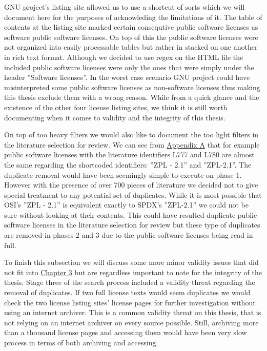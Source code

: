 GNU project's listing site allowed us to use a shortcut of sorts which we will document here for the purposes of acknowleding the limitations of it. The table of contents at the listing site marked certain consequtive public software licenses as software public software licenses. On top of this the public software licenses were not organized into easily processable tables but rather in stacked on one another in rich text format. Although we decided to use regex on the HTML file the included public software licenses were only the ones that were simply under the header ''Software licenses''. In the worst case scenario GNU project could have misinterpreted some public software licenses as non-software licenses thus making this thesis exclude them with a wrong reason. While from a quick glance and the existence of the other four license listing sites, we think it is still worth documenting when it comes to validity and the integrity of this thesis.

On top of too heavy filters we would also like to document the too light filters in the literature selection for review. We can see from \hyperref[appendix:a]{Appendix A} that for example public software licenses with the literature identifiers L777 and L780 are almost the same regarding the shortcoded identifiers: ''ZPL - 2.1'' and ''ZPL-2.1''. The duplicate removal would have been seemingly simple to execute on phase 1. However with the presence of over 700 pieces of literature we decided not to give special treatment to any potential set of duplicates. While it is most possible that OSI's ''ZPL - 2.1'' is equivalent exactly to SPDX's ''ZPL-2.1'' we could not be sure without looking at their contents. This could have resulted duplicate public software licenses in the literature selection for review but these type of duplicates are removed in phases 2 and 3 due to the public software licenses being read in full.

To finish this subsection we will discuss some more minor validity issues that did not fit into \hyperref[results]{Chapter 3} but are regardless important to note for the integrity of the thesis. Stage three of the search process included a validity threat regarding the removal of duplicates. If two full license texts would seem duplicates we would check the two license listing sites' license pages for further investigation without using an internet archiver. This is a common validity threat on this thesis, that is not relying on an internet archiver on every source possible. Still, archiving more than a thousand license pages and accessing them would have been very slow process in terms of both archiving and accessing.

